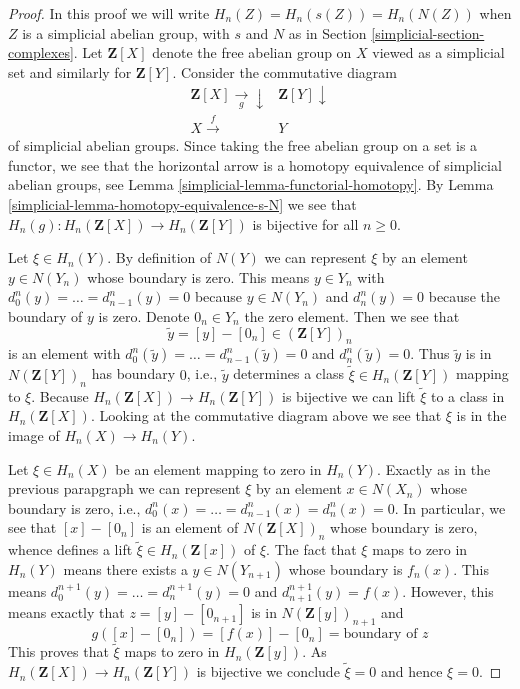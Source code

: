 \begin{proof}

In this proof we will write $H_n(Z) = H_n(s(Z)) = H_n(N(Z))$
when $Z$ is a simplicial abelian group, with $s$ and $N$ as in
Section \ref{simplicial-section-complexes}.
Let $\mathbf{Z}[X]$ denote the free abelian group on $X$ viewed as
a simplicial set and similarly for $\mathbf{Z}[Y]$. Consider the
commutative diagram
$$
\begin{array}{cc}\mathbf{Z}[X] \underset{g}{\longrightarrow}\downarrow & \mathbf{Z}[Y] \downarrow \\ X \overset{f}{\longrightarrow} & Y\end{array}
$$
of simplicial abelian groups. Since taking the free abelian group on a set
is a functor, we see that the horizontal arrow is a homotopy equivalence of
simplicial abelian groups, see Lemma \ref{simplicial-lemma-functorial-homotopy}.
By Lemma \ref{simplicial-lemma-homotopy-equivalence-s-N}
we see that $H_n(g) : H_n(\mathbf{Z}[X]) \to H_n(\mathbf{Z}[Y])$ is bijective
for all $n \geq 0$.

\medskip\noindent
Let $\xi \in H_n(Y)$. By definition of $N(Y)$ we can represent
$\xi$ by an element $y \in N(Y_n)$ whose boundary is zero.
This means $y \in Y_n$ with $d^n_0(y) = \ldots = d^n_{n - 1}(y) = 0$
because $y \in N(Y_n)$ and $d^n_n(y) = 0$ because the boundary
of $y$ is zero. Denote $0_n \in Y_n$ the zero element. Then we see that
$$
\tilde y = [y] - [0_n] \in (\mathbf{Z}[Y])_n
$$
is an element with $d^n_0(\tilde y) = \ldots = d^n_{n - 1}(\tilde y) = 0$
and $d^n_n(\tilde y) = 0$. Thus $\tilde y$ is in $N(\mathbf{Z}[Y])_n$
has boundary $0$, i.e., $\tilde y$ determines a
class $\tilde \xi \in H_n(\mathbf{Z}[Y])$ mapping to $\xi$.
Because $H_n(\mathbf{Z}[X]) \to H_n(\mathbf{Z}[Y])$ is bijective
we can lift $\tilde \xi$ to a class in $H_n(\mathbf{Z}[X])$.
Looking at the commutative diagram above
we see that $\xi$ is in the image of $H_n(X) \to H_n(Y)$.

\medskip\noindent
Let $\xi \in H_n(X)$ be an element mapping to zero in $H_n(Y)$.
Exactly as in the previous parapgraph we can represent
$\xi$ by an element $x \in N(X_n)$ whose boundary is zero, i.e.,
$d^n_0(x) = \ldots = d^n_{n - 1}(x) = d^n_n(x) = 0$.
In particular, we see that $[x] - [0_n]$ is an element of
$N(\mathbf{Z}[X])_n$ whose boundary is zero, whence defines
a lift $\tilde \xi \in H_n(\mathbf{Z}[x])$ of $\xi$.
The fact that $\xi$ maps to zero in $H_n(Y)$
means there exists a $y \in N(Y_{n + 1})$ whose boundary is $f_n(x)$.
This means $d^{n + 1}_0(y) = \ldots = d^{n + 1}_n(y) = 0$ and
$d^{n + 1}_{n + 1}(y) = f(x)$.
However, this means exactly that
$z = [y] - [0_{n + 1}]$ is in $N(\mathbf{Z}[y])_{n + 1}$ and
$$
g([x] - [0_n]) = [f(x)] - [0_n] = \text{boundary of }z
$$
This proves that $\tilde \xi$ maps to zero in $H_n(\mathbf{Z}[y])$.
As $H_n(\mathbf{Z}[X]) \to H_n(\mathbf{Z}[Y])$ is bijective
we conclude $\tilde \xi = 0$ and hence $\xi = 0$.
\end{proof}

